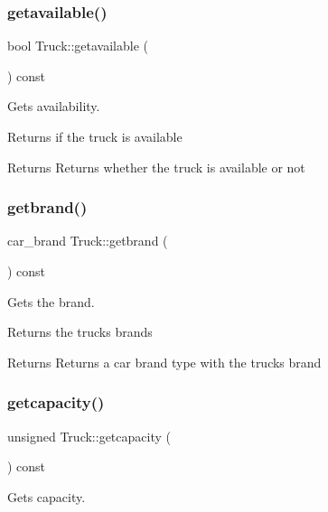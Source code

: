 \subsubsection{\texorpdfstring{getavailable()}{getavailable()}}
{\footnotesize\ttfamily bool Truck\+::getavailable (\begin{DoxyParamCaption}{ }\end{DoxyParamCaption}) const}



Gets availability. 

Returns if the truck is available

\begin{DoxyReturn}{Returns}
Returns whether the truck is available or not 
\end{DoxyReturn}
\mbox{\label{class_truck_aef2b55646cc09f3f2ab21dd4e51ef214}} 
\subsubsection{\texorpdfstring{getbrand()}{getbrand()}}
{\footnotesize\ttfamily car\+\_\+brand Truck\+::getbrand (\begin{DoxyParamCaption}{ }\end{DoxyParamCaption}) const}



Gets the brand. 

Returns the truck\textquotesingle{}s brands

\begin{DoxyReturn}{Returns}
Returns a car brand type with the truck\textquotesingle{}s brand 
\end{DoxyReturn}
\mbox{\label{class_truck_ab8c3a335924da7d2c36c4c5ba4510db0}} 
\subsubsection{\texorpdfstring{getcapacity()}{getcapacity()}}
{\footnotesize\ttfamily unsigned Truck\+::getcapacity (\begin{DoxyParamCaption}{ }\end{DoxyParamCaption}) const}



Gets capacity. 

